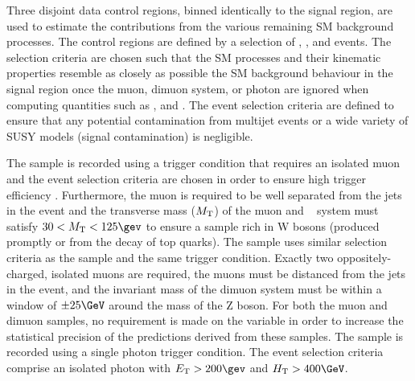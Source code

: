 

Three disjoint data control regions, binned identically to the signal
region, are used to estimate the contributions from the various
remaining SM background processes. The control regions are defined by
a selection of \mj, \mmj, and \gj events. The selection criteria are
chosen such that the SM processes and their kinematic properties
resemble as closely as possible the SM background behaviour in the
signal region once the muon, dimuon system, or photon are ignored when
computing quantities such as \scalht, \mht and \alphat. 
The event selection criteria are defined to ensure that any potential
contamination from multijet events or a wide variety of SUSY models
(\ie signal contamination) is negligible.

The \mj sample is recorded using a trigger condition that requires an
isolated muon and the event selection criteria are chosen in order to ensure 
high trigger efficiency . Furthermore, the
muon is required to be well separated from the jets in the event and
the transverse mass ($M_{\rm T}$) of the muon and
\met~\cite{CMS-PAS-PFT-09-001, CMS-PAS-PFT-10-001} system must satisfy
$30 < M_{\rm T} < 125\gev$ to ensure a sample rich in W bosons
(produced promptly or from the decay of top quarks). The \mmj sample
uses similar selection criteria as the \mj sample and the same trigger
condition. Exactly two
oppositely-charged, isolated muons are required, the muons must be
distanced from the jets in the event, and the invariant mass of the
dimuon system must be within a window of $\pm 25\GeV$ around the mass
of the Z boson. For both the muon and dimuon samples, no requirement
is made on the variable \alphat in order to increase the statistical
precision of the predictions derived from these samples.  The \gj
sample is recorded using a single photon trigger condition. The event
selection criteria comprise an isolated photon with $\Et > 200\gev$ and
$\scalht > 400\GeV$.%

